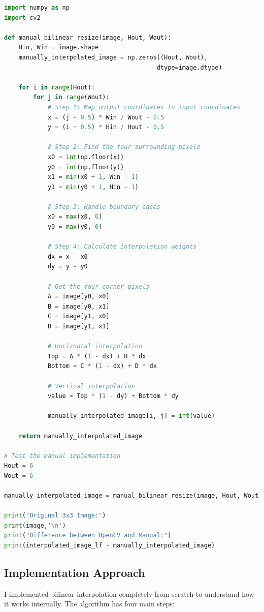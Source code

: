 \documentclass[12pt,a4paper]{report}
\begin{document}
\begin{lstlisting}[language=Python, caption={Manual Bilinear Interpolation from Scratch}]
import numpy as np
import cv2  

def manual_bilinear_resize(image, Hout, Wout):
    Hin, Win = image.shape
    manually_interpolated_image = np.zeros((Hout, Wout), 
                                          dtype=image.dtype)

    for i in range(Hout):
        for j in range(Wout):
            # Step 1: Map output coordinates to input coordinates
            x = (j + 0.5) * Win / Wout - 0.5
            y = (i + 0.5) * Hin / Hout - 0.5
            
            # Step 2: Find the four surrounding pixels
            x0 = int(np.floor(x))
            y0 = int(np.floor(y))
            x1 = min(x0 + 1, Win - 1)
            y1 = min(y0 + 1, Hin - 1)
            
            # Step 3: Handle boundary cases
            x0 = max(x0, 0)
            y0 = max(y0, 0)
            
            # Step 4: Calculate interpolation weights
            dx = x - x0
            dy = y - y0
            
            # Get the four corner pixels
            A = image[y0, x0]
            B = image[y0, x1]
            C = image[y1, x0]
            D = image[y1, x1]
            
            # Horizontal interpolation
            Top = A * (1 - dx) + B * dx
            Bottom = C * (1 - dx) + D * dx
            
            # Vertical interpolation
            value = Top * (1 - dy) + Bottom * dy

            manually_interpolated_image[i, j] = int(value)

    return manually_interpolated_image

# Test the manual implementation
Hout = 6
Wout = 6

manually_interpolated_image = manual_bilinear_resize(image, Hout, Wout)

print("Original 3x3 Image:")
print(image,'\n')
print("Difference between OpenCV and Manual:")
print(interpolated_image_lf - manually_interpolated_image)
\end{lstlisting}

\subsection{Implementation Approach}
I implemented bilinear interpolation completely from scratch to understand how it works internally. The algorithm has four main steps:
\end{document}

